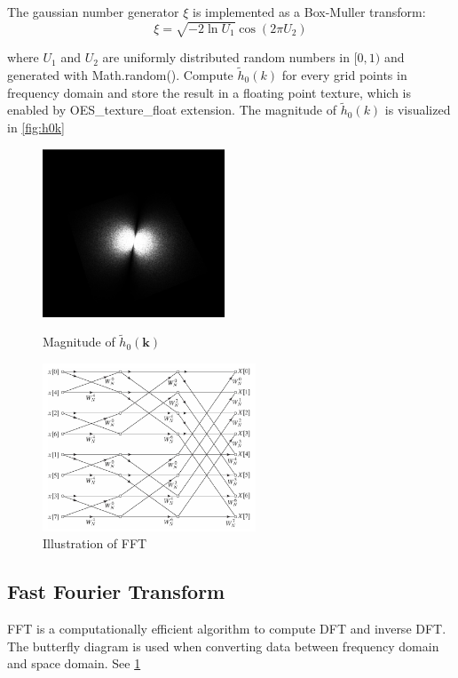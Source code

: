 \documentclass{jcgt}
\begin{document}
The gaussian number generator $\xi$ is implemented as a Box-Muller transform:
\begin{equation}
\xi = \sqrt{-2\ln{U_1}}\cos{(2\pi U_2)}
\end{equation}

where $U_1$ and $U_2$ are uniformly distributed random numbers in $[0, 1)$ and generated with Math.random(). Compute $\tilde{h}_0 (k)$ for every grid points in frequency domain and store the result in a floating point texture, which is enabled by OES\_texture\_float extension. The magnitude of $\tilde{h}_0 (k)$ is visualized in \ref{fig:h0k}

\begin{figure}[htb]
\begin{minipage}{0.49\textwidth}
\centering
   \includegraphics[height=5cm]{h0k.png}
   \caption{\label{fig:h0k}
      Magnitude of $\tilde{h}_0 (\mathbf{k})$}
\end{minipage}\hfill
\begin{minipage}{0.49\textwidth}
\centering
   \includegraphics[height=5cm]{fft.png}
   \caption{\label{fig:fft}
      Illustration of FFT}
\end{minipage}\hfill
\end{figure}

\subsection{Fast Fourier Transform}

FFT is a computationally efficient algorithm to compute DFT and inverse DFT. The butterfly diagram is used when converting  data between frequency domain and space domain. See \ref{fig:fft}\\
\end{document}
